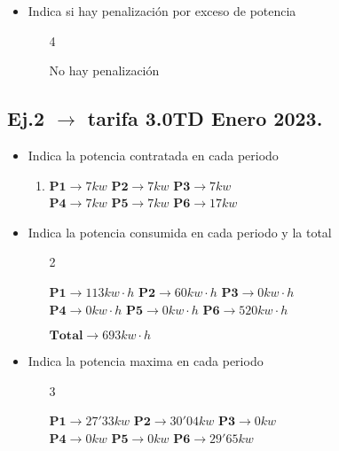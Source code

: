 \documentclass[13pt]{article}
\begin{document}
\begin{flushleft}
\begin{itemize}
  \item Indica si hay penalización por exceso de potencia
    \begin{enumerate}
  \item[4]\begin{flushleft}
     No hay penalización
    \end{flushleft}
  \end{enumerate}

\end{itemize}

\end{flushleft}

\begin{flushleft}
\section{Ej.2 $\to$ tarifa 3.0TD Enero 2023.}
\begin{itemize}
  
  \item Indica la potencia contratada en cada periodo 
  \begin{enumerate}
    \item\begin{flushleft}
      \(\mathbf{P1}\to 7kw\) \hfill \(\mathbf{P2}\to 7kw\) \hfill \(\mathbf{P3}\to 7kw\) \hfill  
      \\  
      \(\mathbf{P4}\to 7kw\) \hfill \(\mathbf{P5}\to 7kw\) \hfill \(\mathbf{P6}\to 17kw\)
    \end{flushleft}
\end{enumerate}

  \item Indica la potencia  consumida en cada periodo y la total
    \begin{enumerate}
      \item[2]\begin{flushleft}
      \(\mathbf{P1}\to 113kw\cdot h\) \hfill \(\mathbf{P2}\to 60kw\cdot h\) \hfill \(\mathbf{P3}\to 0kw\cdot h\) \hfill  
      \\  
      \(\mathbf{P4}\to 0kw\cdot h\) \hfill \(\mathbf{P5}\to 0kw\cdot h\) \hfill \(\mathbf{P6}\to 520kw\cdot h\)
      \\
      \begin{flushright}
        \(\mathbf{Total}\to 693kw\cdot h\)
      \end{flushright}
    \end{flushleft}
\end{enumerate}
  \item Indica la potencia maxima en cada periodo   
    \begin{enumerate}
      \item[3]\begin{flushleft}
      \(\mathbf{P1}\to 27'33kw\) \hfill \(\mathbf{P2}\to 30'04kw\) \hfill\(\mathbf{P3}\to 0kw\) \hfill
      \\  
      \(\mathbf{P4}\to 0kw\) \hfill \(\mathbf{P5}\to 0kw\) \hfill\(\mathbf{P6}\to 29'65kw\) \hfill
      \\
    \end{flushleft}
\end{enumerate}


\end{itemize}
\end{flushleft}
\end{document}
